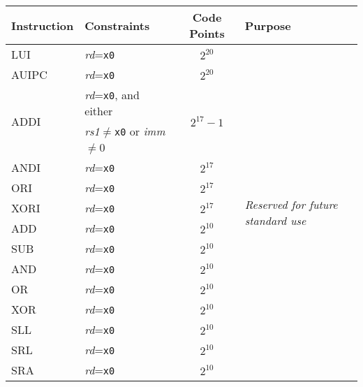 \begin{table}[hbt]
\centering
\begin{tabular}{|l|l|c|l|}
  \hline
  Instruction           & Constraints                                 & Code Points & Purpose \\ \hline \hline
  LUI                   & {\em rd}={\tt x0}                           & $2^{20}$                    & \multirow{15}{*}{\em Reserved for future standard use} \\ \cline{1-3}
  AUIPC                 & {\em rd}={\tt x0}                           & $2^{20}$                    & \\ \cline{1-3}
  \multirow{2}{*}{ADDI} & {\em rd}={\tt x0}, and either               & \multirow{2}{*}{$2^{17}-1$} & \\
                        & {\em rs1}$\neq${\tt x0} or {\em imm}$\neq$0 &                             & \\ \cline{1-3}
  ANDI                  & {\em rd}={\tt x0}                           & $2^{17}$                    & \\ \cline{1-3}
  ORI                   & {\em rd}={\tt x0}                           & $2^{17}$                    & \\ \cline{1-3}
  XORI                  & {\em rd}={\tt x0}                           & $2^{17}$                    & \\ \cline{1-3}
  ADD                   & {\em rd}={\tt x0}                           & $2^{10}$                    & \\ \cline{1-3}
  SUB                   & {\em rd}={\tt x0}                           & $2^{10}$                    & \\ \cline{1-3}
  AND                   & {\em rd}={\tt x0}                           & $2^{10}$                    & \\ \cline{1-3}
  OR                    & {\em rd}={\tt x0}                           & $2^{10}$                    & \\ \cline{1-3}
  XOR                   & {\em rd}={\tt x0}                           & $2^{10}$                    & \\ \cline{1-3}
  SLL                   & {\em rd}={\tt x0}                           & $2^{10}$                    & \\ \cline{1-3}
  SRL                   & {\em rd}={\tt x0}                           & $2^{10}$                    & \\ \cline{1-3}
  SRA                   & {\em rd}={\tt x0}                           & $2^{10}$                    & \\ \cline{1-3}

\end{tabular}
\end{table}
